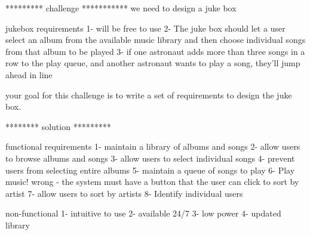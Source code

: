 ********* challenge *********** 
we need to design a juke box 


jukebox requirements
1- will be free to use 
2- The juke box should let a user select an album from the available music library
and then choose individual songs from that album to be played
3- if one astronaut adds more than three songs in a row to the play queue, and another astronaut wants to play a song, they'll jump ahead in line

your goal for this challenge is to write a set of requirements to design the juke box.

******** solution *********


functional requirements 
1- maintain a library of albums and songs 
2- allow users to browse albums and songs 
3- allow users to select individual songs 
4- prevent users from selecting entire albums
5- maintain a queue of songs to play 
6- Play music! 
wrong - the system must have a button that the user can click to sort by artist
7- allow users to sort by artists 
8- Identify individual users 

non-functional
1- intuitive to use
2- available 24/7 
3- low power 
4- updated library 

